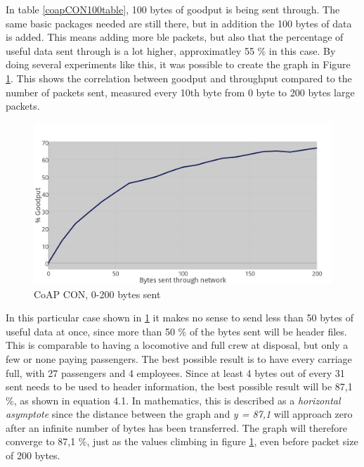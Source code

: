In table \ref{coapCON100table}, 100 bytes of goodput is being sent through. The same basic packages needed are still there, but in addition the 100 bytes of data is added. This means adding more \gls{ble} packets, but also that the percentage of useful data sent through is a lot higher, approximatley 55 \% in this case. By doing several experiments like this, it was possible to create the graph in Figure \ref{fig:coapCON0200}. This shows the correlation between goodput and throughput compared to the number of packets sent, measured every 10th byte from 0 byte to 200 bytes large packets.


\begin{figure}[ht]
    \centering
    \includegraphics[scale=1.0]{CON0to200plot09thickerGRAY.png}    
    \caption{CoAP CON, 0-200 bytes sent}
    \label{fig:coapCON0200}
\end{figure}



In this particular case shown in \ref{fig:coapCON0200} it makes no sense to send less than 50 bytes of useful data at once, since more than 50 \% of the bytes sent will be header files. This is comparable to having a locomotive and full crew at disposal, but only a few or none paying passengers. The best possible result is to have every carriage full, with 27 passengers and 4 employees. Since at least 4 bytes out of every 31 sent needs to be used to header information, the best possible result will be 87,1 \%, as shown in equation 4.1. In mathematics, this is described as a \textit{horizontal asymptote} since the distance between the graph and \textit{y = 87,1} will approach zero after an infinite number of bytes has been transferred. The graph will therefore converge to 87,1 \%, just as the values climbing in figure \ref{fig:coapCON0200}, even before packet size of 200 bytes.  

